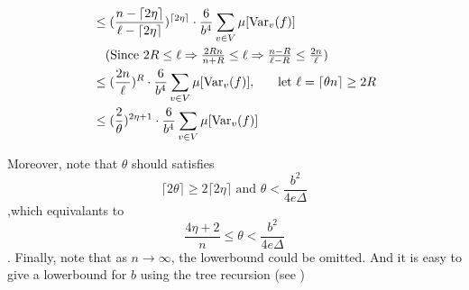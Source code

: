 \documentclass{article}
\def\Var{\mathrm{Var}}
\begin{document}
\begin{align*}
  &\leq (\frac{n-\lceil 2\eta\rceil}{\ell-\lceil 2\eta \rceil})^{\lceil 2\eta\rceil} \cdot \frac{6}{b^4}\sum_{v\in V}\mu[\Var_v(f)] \\
  &\ \ \  \mbox{(Since $2R\leq \ell \Rightarrow \frac{2Rn}{n + R} \leq \ell \Rightarrow \frac{n-R}{\ell-R} \leq \frac{2n}{\ell}$)} \\
  &\leq (\frac{2n}{\ell})^R \cdot \frac{6}{b^4}\sum_{v\in V}\mu[\Var_v(f)] ,\hspace{0.5cm} \mbox{ let $\ell = \lceil\theta n\rceil \geq 2R$}\\
  &\leq (\frac{2}{\theta})^{2\eta + 1}\cdot \frac{6}{b^4}\sum_{v\in V}\mu[\Var_v(f)] \\
\end{align*}

Moreover, note that $\theta$ should satisfies
\[\lceil 2\theta\rceil \geq 2\lceil 2\eta \rceil \mbox{ and } \theta < \frac{b^2}{4e\Delta}\]
,which equivalants to
\[\frac{4\eta + 2}{n} \leq \theta < \frac{b^2}{4e\Delta}\].
Finally, note that as $n\to\infty$, the lowerbound could be omitted.
And it is easy to give a lowerbound for $b$ using the tree recursion (see \cite{CLV20-1})



\clearpage


\end{document}

